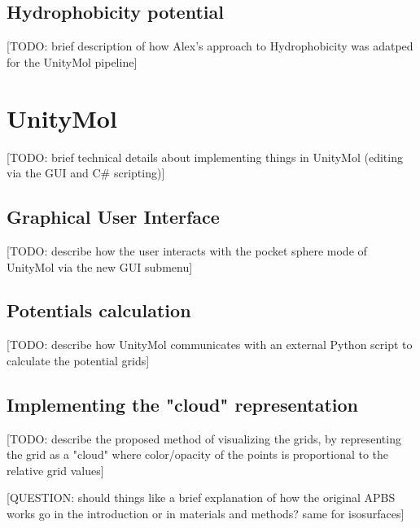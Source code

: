   \subsection{Hydrophobicity potential}
    [TODO: brief description of how Alex's approach to Hydrophobicity was adatped for the UnityMol pipeline]


\section{UnityMol}
  [TODO: brief technical details about implementing things in UnityMol (editing via the GUI and C\# scripting)]

  \subsection{Graphical User Interface}
    [TODO: describe how the user interacts with the pocket sphere mode of UnityMol via the new GUI submenu]

  \subsection{Potentials calculation}
    [TODO: describe how UnityMol communicates with an external Python script to calculate the potential grids]

  \subsection{Implementing the "cloud" representation}
    [TODO: describe the proposed method of visualizing the grids, by representing the grid as a "cloud" where color/opacity of the points is proportional to the relative grid values]


[QUESTION: should things like a brief explanation of how the original APBS works go in the introduction or in materials and methods? same for isosurfaces]
